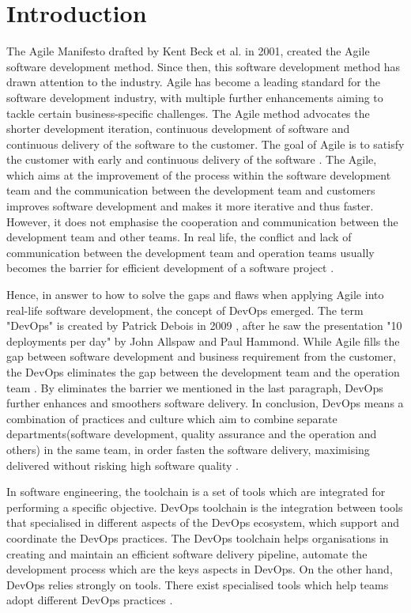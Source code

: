 \chapter{Introduction}
\label{chp:introduction}
The Agile Manifesto \cite{beck2001manifesto} drafted by Kent Beck et al. in 2001, created the Agile software development method. Since then, this software development method has drawn attention to the industry. Agile has become a leading standard for the software development industry, with multiple further enhancements aiming to tackle certain business-specific challenges.
The Agile method advocates the shorter development iteration, continuous development of software and continuous delivery of the software to the customer. The goal of Agile is to satisfy the customer with early and continuous delivery of the software \cite{beck2001manifesto}.
The Agile, which aims at the improvement of the process within the software development team and the communication between the development team and customers \cite{miglierina2014application} improves software development and makes it more iterative and thus faster. However, it does not emphasise the cooperation and communication between the development team and other teams. In real life, the conflict and lack of communication between the development team and operation teams usually becomes the barrier for efficient development of a software project \cite{jabbari2016devops}.
\par
Hence, in answer to how to solve the gaps and flaws when applying Agile into real-life software development, the concept of DevOps emerged. The term "DevOps" is created by Patrick Debois in 2009 \cite{kim2016devops}, after he saw the presentation "10 deployments per day" by John Allspaw and Paul Hammond. While Agile fills the gap between software development and business requirement from the customer, the DevOps eliminates the gap between the development team and the operation team \cite{WhatisaD20:online}. By eliminates the barrier we mentioned in the last paragraph, DevOps further enhances and smoothers software delivery. In conclusion, DevOps means a combination of practices and culture which aim to combine separate departments(software development, quality assurance and the operation and others) in the same team, in order fasten the software delivery, maximising delivered without risking high software quality \cite{DevOpsWi87:online}\cite{ebert2016devops}.
\par
In software engineering, the toolchain is a set of tools which are integrated for performing a specific objective. DevOps toolchain is the integration between tools that specialised in different aspects of the DevOps ecosystem, which support and coordinate the DevOps practices. The DevOps toolchain helps organisations in creating and maintain an efficient software delivery pipeline, automate the development process \cite{DevOpsto7:online} which are the keys aspects in DevOps. On the other hand, DevOps relies strongly on tools. There exist specialised tools which help teams adopt different DevOps practices \cite{zhu2016devops}. 
